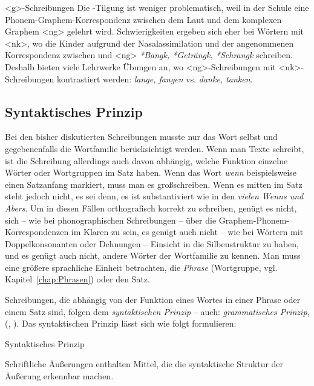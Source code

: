 \begin{Exkurs}{<g>-Schreibungen}
Die -Tilgung ist weniger problematisch, weil in der Schule eine Phonem-Graphem-Korrespondenz zwischen dem Laut \textipa{[N]} und dem komplexen Graphem <ng> gelehrt wird. Schwierigkeiten ergeben sich eher bei Wörtern mit <nk>, wo die Kinder aufgrund der Nasalassimilation und der angenommenen Korrespondenz zwischen \textipa{[N]} und <ng> \zB \textit{*Bangk, *Geträngk, *Schrangk} schreiben. Deshalb bieten viele Lehrwerke Übungen an, wo <ng>-Schreibungen mit <nk>-Schreibungen kontrastiert werden: \textit{lange, fangen} vs. \textit{danke, tanken}.

\end{Exkurs}

\subsection{Syntaktisches Prinzip}\label{sec:syntPrinz}

Bei den bisher diskutierten Schreibungen musste nur das Wort selbst und gegebenenfalls die Wortfamilie berücksichtigt werden. Wenn man Texte schreibt, ist die Schreibung allerdings auch davon abhängig, welche Funktion einzelne Wörter oder Wortgruppen im Satz haben. Wenn das Wort \textit{wenn} beispielsweise einen Satzanfang markiert, muss man es großschreiben. Wenn es mitten im Satz steht jedoch nicht, es sei denn, es ist substantiviert wie in den \textit{vielen Wenns und Abers}. Um in diesen Fällen orthografisch korrekt zu schreiben, genügt es nicht, sich -- wie bei phonographischen Schreibungen -- über die Graphem-Phonem-Korrespondenzen im Klaren zu sein, es genügt auch nicht -- wie bei Wörtern mit Doppelkonsonanten oder Dehnungen -- Einsicht in die Silbenstruktur zu haben, und es genügt auch nicht, andere Wörter der Wortfamilie zu kennen. Man muss eine größere sprachliche Einheit betrachten, die \textit{Phrase} (Wortgruppe, vgl. Kapitel~\ref{chap:Phrasen}) oder den Satz.

Schreibungen, die abhängig von der Funktion eines Wortes in einer Phrase oder einem Satz sind, folgen dem \textit{syntaktischen Prinzip} -- auch: \textit{grammatisches Prinzip}, (\cite[146ff]{Duerscheid2016}, \cite[43]{GallmannSitta1996}). Das syntaktischen Prinzip lässt sich wie folgt formulieren:

\begin{Definition}{Syntaktisches Prinzip}

\noindent Schriftliche Äußerungen enthalten Mittel, die die syntaktische Struktur der Äußerung erkennbar machen.

\end{Definition}


